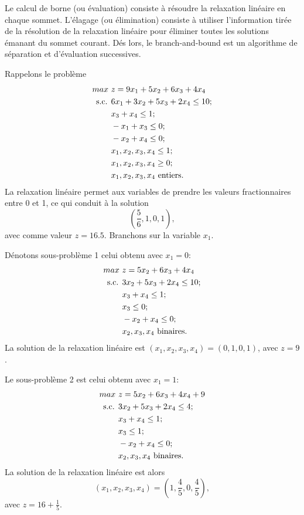Le calcul de borne (ou évaluation) consiste à résoudre la relaxation linéaire en chaque sommet.
L'élagage (ou élimination) consiste à utiliser l'information tirée de la résolution de la relaxation linéaire pour éliminer toutes les solutions émanant du sommet courant.
Dés lors, le branch-and-bound est un algorithme de séparation et d'évaluation successives.

\begin{example}
Rappelons le problème
\begin{align*}
max\ & z = 9x_1 + 5x_2 + 6x_3 + 4x_4 \\
\mbox{s.c. } & 6x_1 + 3x_2 + 5x_3 + 2x_4 \leq 10; \\
& x_3 + x_4 \leq 1; \\
& -x_1 + x_3 \leq 0; \\
& -x_2 + x_4 \leq 0; \\
& x_1, x_2, x_3, x_4 \leq 1; \\
& x_1, x_2, x_3, x_4 \geq 0; \\
& x_1, x_2, x_3, x_4 \mbox{ entiers}.
\end{align*}
La relaxation linéaire permet aux variables de prendre les valeurs fractionnaires entre 0 et 1, ce qui conduit à la solution
\[
\left( \frac{5}{6}, 1, 0, 1 \right),
\]
avec comme valeur $z = 16.5$.
Branchons sur la variable $x_1$.

Dénotons sous-problème 1 celui obtenu avec $x_1 = 0$:
\begin{align*}
max\ & z = 5x_2 + 6x_3 + 4x_4 \\
\mbox{s.c. } & 3x_2 + 5x_3 + 2x_4 \leq 10; \\
& x_3 + x_4 \leq 1; \\
& x_3 \leq 0; \\
& -x_2 + x_4 \leq 0; \\
& x_2, x_3, x_4 \mbox{ binaires}.
\end{align*}
La solution de la relaxation linéaire est $(x_1, x_2, x_3, x_4) = (0,1,0,1)$, avec $z = 9$.

Le sous-problème 2 est celui obtenu avec $x_1 = 1$:
\begin{align*}
max\ & z = 5x_2 + 6x_3 + 4x_4 + 9 \\
\mbox{s.c. } & 3x_2 + 5x_3 + 2x_4 \leq 4; \\
& x_3 + x_4 \leq 1; \\
& x_3 \leq 1; \\
& -x_2 + x_4 \leq 0; \\
& x_2, x_3, x_4 \mbox{ binaires}.
\end{align*}
La solution de la relaxation linéaire est alors
\[
(x_1, x_2, x_3, x_4) = \left( 1, \frac{4}{5},0, \frac{4}{5} \right),
\]
avec $z = 16+\frac{1}{5}$.
\end{example}

